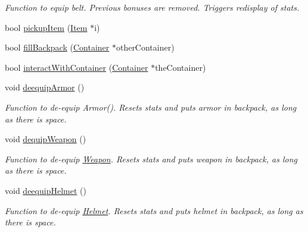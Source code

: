 \begin{DoxyCompactItemize}
\begin{DoxyCompactList}\small\item\em Function to equip belt. Previous bonuses are removed. Triggers redisplay of stats. \end{DoxyCompactList}\item 
bool \hyperlink{class_fighter_a69dccfbc61abf5720e8a329203158d1e}{pickup\+Item} (\hyperlink{class_item}{Item} $\ast$i)
\item 
bool \hyperlink{class_fighter_a572fb61d329f4993701900ff3a1db5f8}{fill\+Backpack} (\hyperlink{class_container}{Container} $\ast$other\+Container)
\item 
bool \hyperlink{class_fighter_a66c0adfa4979fa3ac994359a188121a8}{interact\+With\+Container} (\hyperlink{class_container}{Container} $\ast$the\+Container)
\item 
\hypertarget{class_fighter_ac7a95f5d4b59bca227f847924625ffc2}{}\label{class_fighter_ac7a95f5d4b59bca227f847924625ffc2} 
void \hyperlink{class_fighter_ac7a95f5d4b59bca227f847924625ffc2}{deequip\+Armor} ()
\begin{DoxyCompactList}\small\item\em Function to de-\/equip Armor(). Resets stats and puts armor in backpack, as long as there is space. \end{DoxyCompactList}\item 
\hypertarget{class_fighter_a277fd0526a0318923f2775356f30972f}{}\label{class_fighter_a277fd0526a0318923f2775356f30972f} 
void \hyperlink{class_fighter_a277fd0526a0318923f2775356f30972f}{dequip\+Weapon} ()
\begin{DoxyCompactList}\small\item\em Function to de-\/equip \hyperlink{class_weapon}{Weapon}. Resets stats and puts weapon in backpack, as long as there is space. \end{DoxyCompactList}\item 
\hypertarget{class_fighter_a9e6f83324d66e6467d8af19e91c13781}{}\label{class_fighter_a9e6f83324d66e6467d8af19e91c13781} 
void \hyperlink{class_fighter_a9e6f83324d66e6467d8af19e91c13781}{deequip\+Helmet} ()
\begin{DoxyCompactList}\small\item\em Function to de-\/equip \hyperlink{class_helmet}{Helmet}. Resets stats and puts helmet in backpack, as long as there is space. \end{DoxyCompactList}\item 
\hypertarget{class_fighter_add80df04f0659d37c0e30e91314e3d5e}{}\label{class_fighter_add80df04f0659d37c0e30e91314e3d5e} 

\end{DoxyCompactItemize}
